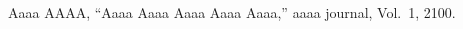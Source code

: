 \documentclass[12pt,openany,english]{jsbook}        %
\begin{document}
%
%
%
\begin{thebibliography}{200}
%
%
%
\begin{doublespace}
%
Aaaa AAAA, 
``Aaaa Aaaa Aaaa Aaaa Aaaa,'' aaaa journal, Vol.~1, 2100.
%
%
%
\end{doublespace}
%
%
%
\end{thebibliography}  
%
%
%
\end{document}
